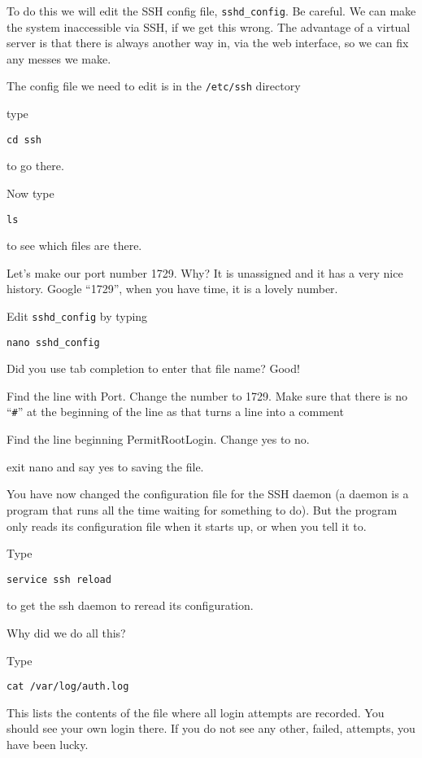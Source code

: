\documentclass[12pt, a4paper]{article}
\begin{document}
To do this we will edit the SSH config file, \verb|sshd_config|. Be careful. We can make the system inaccessible via SSH, if we get this wrong. The advantage of a virtual server is that there is always another way in, via the web interface, so we can fix any messes we make.

The config file we need to edit is in the \verb|/etc/ssh| directory

type
\begin{verbatim}
cd ssh
\end{verbatim}

to go there.

Now type

\begin{verbatim}
ls
\end{verbatim}
 
to see which files are there.

Let’s make our port number 1729. Why? It is unassigned and it has a very nice history. Google “1729”, when you have time, it is a lovely number.

Edit \verb|sshd_config| by typing

\begin{verbatim}
nano sshd_config
\end{verbatim}

Did you use tab completion to enter that file name? Good!

Find the line with Port. Change the number to 1729. Make sure that there is no ``\verb|#|'' at the beginning of the line as that turns a line into a comment 

Find the line beginning PermitRootLogin. Change yes to no.

exit nano and say yes to saving the file.

You have now changed the configuration file for the SSH daemon (a daemon is a program that runs all the time waiting for something to do). But the program only reads its configuration file when it starts up, or when you tell it to.

Type
\begin{verbatim}
service ssh reload
\end{verbatim}
to get the ssh daemon to reread its configuration.

Why did we do all this?

Type 
\begin{verbatim}
cat /var/log/auth.log
\end{verbatim}

This lists the contents of the file where all login attempts are recorded. You should see your own login there. If you do not see any other, failed, attempts, you have been lucky.
\end{document}
